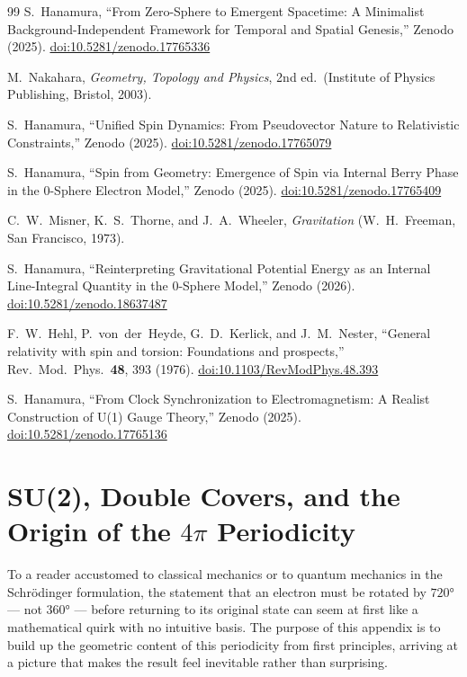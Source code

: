 \documentclass[%
 reprint,
 amsmath,amssymb,
 aps,
 prb,
]{revtex4-2}
\numberwithin{equation}{section}
\begin{document}
\begin{thebibliography}{99}
S.~Hanamura, ``From Zero-Sphere to Emergent Spacetime: A Minimalist Background-Independent Framework for Temporal and Spatial Genesis,'' Zenodo (2025). \href{https://doi.org/10.5281/zenodo.17765336}{doi:10.5281/zenodo.17765336}

M.~Nakahara, \textit{Geometry, Topology and Physics}, 2nd ed.\ (Institute of Physics Publishing, Bristol, 2003).

S.~Hanamura, ``Unified Spin Dynamics: From Pseudovector Nature to Relativistic Constraints,'' Zenodo (2025). \href{https://doi.org/10.5281/zenodo.17765079}{doi:10.5281/zenodo.17765079}

S.~Hanamura, ``Spin from Geometry: Emergence of Spin via Internal Berry Phase in the 0-Sphere Electron Model,'' Zenodo (2025). \href{https://doi.org/10.5281/zenodo.17765409}{doi:10.5281/zenodo.17765409}

C.~W.~Misner, K.~S.~Thorne, and J.~A.~Wheeler, \textit{Gravitation} (W.~H.~Freeman, San Francisco, 1973).

S.~Hanamura, ``Reinterpreting Gravitational Potential Energy as an Internal Line-Integral Quantity in the 0-Sphere Model,'' Zenodo (2026). \href{https://doi.org/10.5281/zenodo.18637487}{doi:10.5281/zenodo.18637487}

F.~W.~Hehl, P.~von~der~Heyde, G.~D.~Kerlick, and J.~M.~Nester, ``General relativity with spin and torsion: Foundations and prospects,'' Rev.\ Mod.\ Phys.\ \textbf{48}, 393 (1976). \href{https://doi.org/10.1103/RevModPhys.48.393}{doi:10.1103/RevModPhys.48.393}

S.~Hanamura, ``From Clock Synchronization to Electromagnetism: A Realist Construction of U(1) Gauge Theory,'' Zenodo (2025). \href{https://doi.org/10.5281/zenodo.17765136}{doi:10.5281/zenodo.17765136}

\end{thebibliography}


\appendix

\section{SU(2), Double Covers, and the Origin of the $4\pi$ Periodicity}
\label{app:su2}

To a reader accustomed to classical mechanics or to quantum mechanics in the Schrödinger formulation, the statement that an electron must be rotated by $720°$ --- not $360°$ --- before returning to its original state can seem at first like a mathematical quirk with no intuitive basis. The purpose of this appendix is to build up the geometric content of this periodicity from first principles, arriving at a picture that makes the result feel inevitable rather than surprising.
\end{document}
